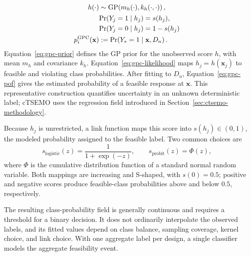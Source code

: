 \documentclass[twoside]{article}
\begin{document}
\begin{subequations}\label{eq:gpc-model}
\renewcommand{\theequation}{\theparentequation.\arabic{equation}}
\begin{align}
  h(\cdot) &\sim \mathrm{GP}\!\left(
    m_h(\cdot),k_h(\cdot,\cdot)\right),
  \label{eq:gpc-prior}\\
  &\begin{aligned}
    \Pr(Y_j=1\mid h_j)&=s(h_j),\\
    \Pr(Y_j=0\mid h_j)&=1-s(h_j)
  \end{aligned}
  \label{eq:gpc-likelihood}\\
  p_i^{\mathrm{GPC}}(\mathbf{x})
    &:=\Pr\!\left(Y_*=1\mid\mathbf{x},D_n\right).
  \label{eq:gpc-pof}
\end{align}
\end{subequations}
Equation~\eqref{eq:gpc-prior} defines the GP prior for the unobserved score
\(h\), with mean \(m_h\) and covariance \(k_h\).
Equation~\eqref{eq:gpc-likelihood} maps
\(h_j=h(\mathbf{x}_j)\) to feasible and violating class probabilities. After
fitting to \(D_n\), Equation~\eqref{eq:gpc-pof} gives the estimated probability
of a feasible response at \(\mathbf{x}\). This representative construction
quantifies uncertainty in an unknown deterministic label; cTSEMO uses the
regression field introduced in Section~\ref{sec:ctsemo-methodology}.

Because \(h_j\) is unrestricted, a link function maps this score into
\(s(h_j)\in(0,1)\), the modeled probability assigned to the feasible label.
Two common choices are
\[
  s_{\mathrm{logistic}}(z)=\frac{1}{1+\exp(-z)},
  \qquad
  s_{\mathrm{probit}}(z)=\Phi(z),
\]
where \(\Phi\) is the cumulative distribution function of a standard normal
random variable. Both mappings are increasing and S-shaped, with \(s(0)=0.5\);
positive and negative scores produce feasible-class probabilities above and
below \(0.5\), respectively.

The resulting class-probability field is generally continuous and requires a
threshold for a binary decision. It does not ordinarily interpolate the
observed labels, and its fitted values depend on class balance, sampling
coverage, kernel choice, and link choice. With one aggregate label per design,
a single classifier models the aggregate feasibility event.
\end{document}
